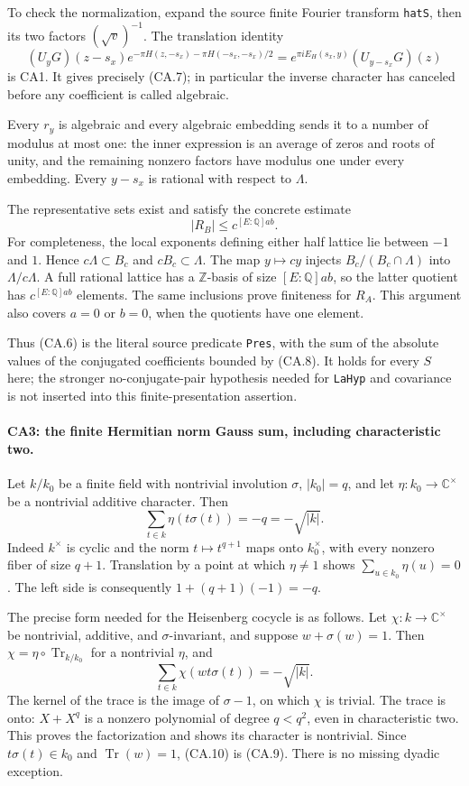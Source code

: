 To check the normalization, expand the source finite Fourier
transform \texttt{hatS}, then its two factors $(\sqrt v)^{-1}$.
The translation identity
\[
 (U_yG)(z-s_x)e^{-\pi H(z,-s_x)-\pi H(-s_x,-s_x)/2}
       =e^{\pi iE_H(s_x,y)}(U_{y-s_x}G)(z)
\]
is CA1. It gives precisely (CA.7); in particular the inverse character
has canceled before any coefficient is called algebraic.

Every $r_y$ is algebraic and every algebraic embedding sends it to a
number of modulus at most one: the inner expression is an average
of zeros and roots of unity, and the remaining nonzero factors have
modulus one under every embedding. Every $y-s_x$ is rational with
respect to $\Lambda$.

The representative sets exist and satisfy the concrete estimate
\[
 |R_B|\le c^{[E:\mathbb Q]ab}.
 \tag{CA.8}
\]
For completeness, the local exponents defining either half lattice
lie between $-1$ and $1$. Hence $c\Lambda\subset B_c$ and
$cB_c\subset\Lambda$. The map $y\mapsto cy$ injects
$B_c/(B_c\cap\Lambda)$ into $\Lambda/c\Lambda$. A full rational
lattice has a $\mathbb Z$-basis of size $[E:\mathbb Q]ab$, so the
latter quotient has $c^{[E:\mathbb Q]ab}$ elements. The same
inclusions prove finiteness for $R_A$. This argument also covers
$a=0$ or $b=0$, when the quotients have one element.

Thus (CA.6) is the literal source predicate \texttt{Pres}, with the
sum of the absolute values of the conjugated coefficients bounded
by (CA.8). It holds for every $S$ here; the stronger no-conjugate-pair
hypothesis needed for \texttt{LaHyp} and covariance is not inserted
into this finite-presentation assertion.

\paragraph{CA3: the finite Hermitian norm Gauss sum, including characteristic two.}
Let $k/k_0$ be a finite field with nontrivial involution $\sigma$,
$|k_0|=q$, and let $\eta:k_0\to\mathbb C^\times$ be a nontrivial
additive character. Then
\[
 \sum_{t\in k}\eta(t\sigma(t))=-q=-\sqrt{|k|}.
 \tag{CA.9}
\]
Indeed $k^\times$ is cyclic and the norm $t\mapsto t^{q+1}$ maps
onto $k_0^\times$, with every nonzero fiber of size $q+1$.
Translation by a point at which $\eta\ne1$ shows
$\sum_{u\in k_0}\eta(u)=0$. The left side is consequently
$1+(q+1)(-1)=-q$.

The precise form needed for the Heisenberg cocycle is as follows.
Let $\chi:k\to\mathbb C^\times$ be nontrivial, additive, and
$\sigma$-invariant, and suppose $w+\sigma(w)=1$.
Then $\chi=\eta\circ\operatorname{Tr}_{k/k_0}$ for a nontrivial
$\eta$, and
\[
 \sum_{t\in k}\chi(wt\sigma(t))=-\sqrt{|k|}.
 \tag{CA.10}
\]
The kernel of the trace is the image of $\sigma-1$, on which
$\chi$ is trivial. The trace is onto: $X+X^q$ is a nonzero polynomial
of degree $q<q^2$, even in characteristic two. This proves the
factorization and shows its character is nontrivial. Since
$t\sigma(t)\in k_0$ and $\operatorname{Tr}(w)=1$, (CA.10) is
(CA.9). There is no missing dyadic exception.

